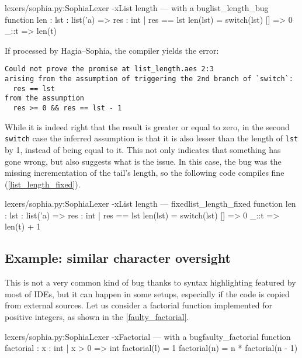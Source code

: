 \begin{code}[H]{lexers/sophia.py:SophiaLexer -x}{List length --- with a bug}{list_length_bug}
function
  len : {lst : list('a)} => {res : int | res == lst}
  len(lst) = switch(lst)
    []   => 0
    _::t => len(t)
\end{code}

If processed by Hagia--Sophia, the compiler yields the error:

\begin{Verbatim}[samepage=true]
Could not prove the promise at list_length.aes 2:3
arising from the assumption of triggering the 2nd branch of `switch`:
  res == lst
from the assumption
  res >= 0 && res == lst - 1
\end{Verbatim}

While it is indeed right that the result is greater or equal to zero, in the
second \texttt{switch} case the inferred assumption is that it is also lesser
than the length of \texttt{lst} by 1, instead of being equal to it. This not
only indicates that something has gone wrong, but also suggests what is the
issue. In this case, the bug was the missing incrementation of the tail's
length, so the following code compiles fine (\autoref{list_length_fixed}).

\begin{code}[H]{lexers/sophia.py:SophiaLexer -x}{List length --- fixed}{list_length_fixed}
function
  len : {lst : list('a)} => {res : int | res == lst}
  len(lst) = switch(lst)
    []   => 0
    _::t => len(t) + 1
\end{code}

\subsection{Example: similar character oversight}
\label{similar_character_example}

This is not a very common kind of bug thanks to syntax highlighting featured by
most of IDEs, but it can happen in some setups, especially if the code is copied
from external sources. Let us consider a factorial function implemented for
positive integers, as shown in the \autoref{faulty_factorial}.

\begin{code}[H]{lexers/sophia.py:SophiaLexer -x}{Factorial --- with a bug}{faulty_factorial}
function
  factorial : {x : int | x > 0} => int
  factorial(l) = 1
  factorial(n) = n * factorial(n - 1)
\end{code}

